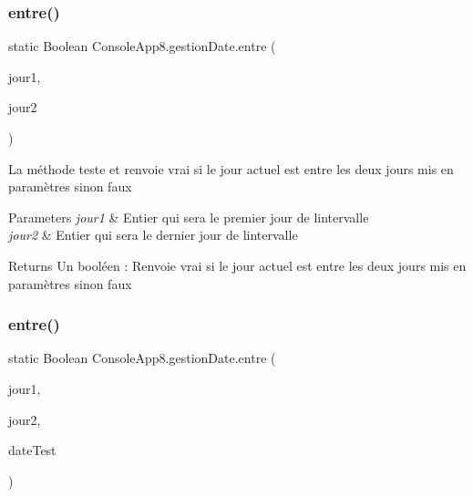 \subsubsection{\texorpdfstring{entre()}{entre()}\hspace{0.1cm}{\footnotesize\ttfamily [1/2]}}
{\footnotesize\ttfamily static Boolean Console\+App8.\+gestion\+Date.\+entre (\begin{DoxyParamCaption}\item[{int}]{jour1,  }\item[{int}]{jour2 }\end{DoxyParamCaption})\hspace{0.3cm}{\ttfamily [static]}}



La méthode teste et renvoie vrai si le jour actuel est entre les deux jours mis en paramètres sinon faux ~\newline



\begin{DoxyParams}{Parameters}
{\em jour1} & Entier qui sera le premier jour de l\textquotesingle{}intervalle\\
\hline
{\em jour2} & Entier qui sera le dernier jour de l\textquotesingle{}intervalle\\
\hline
\end{DoxyParams}
\begin{DoxyReturn}{Returns}
Un booléen \+: Renvoie vrai si le jour actuel est entre les deux jours mis en paramètres sinon faux
\end{DoxyReturn}
\mbox{\label{class_console_app8_1_1gestion_date_a9fc9223a86a8ceda232234d99e92a01f}} 
\subsubsection{\texorpdfstring{entre()}{entre()}\hspace{0.1cm}{\footnotesize\ttfamily [2/2]}}
{\footnotesize\ttfamily static Boolean Console\+App8.\+gestion\+Date.\+entre (\begin{DoxyParamCaption}\item[{int}]{jour1,  }\item[{int}]{jour2,  }\item[{Date\+Time}]{date\+Test }\end{DoxyParamCaption})\hspace{0.3cm}{\ttfamily [static]}}



